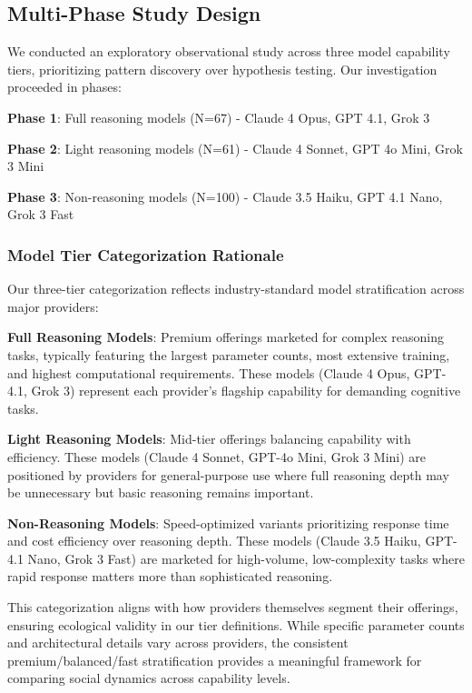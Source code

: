 \documentclass[11pt,letterpaper]{article}
\newcommand{\exponedataTotalSessionsRaw}{67}
\newcommand{\exponedataTotalSessions}{N=\exponedataTotalSessionsRaw}
\newcommand{\exptwoTotalSessionsRaw}{61}
\newcommand{\exptwoTotalSessions}{N=\exptwoTotalSessionsRaw}
\newcommand{\expthreeTotalSessionsRaw}{100}
\newcommand{\expthreeTotalSessions}{N=\expthreeTotalSessionsRaw}
\begin{document}
\subsection{Multi-Phase Study Design}

We conducted an exploratory observational study across three model capability tiers, prioritizing pattern discovery over hypothesis testing. Our investigation proceeded in phases:

\textbf{Phase 1}: Full reasoning models (\exponedataTotalSessions{}) - Claude 4 Opus, GPT 4.1, Grok 3

\textbf{Phase 2}: Light reasoning models (\exptwoTotalSessions{}) - Claude 4 Sonnet, GPT 4o Mini, Grok 3 Mini

\textbf{Phase 3}: Non-reasoning models (\expthreeTotalSessions{}) - Claude 3.5 Haiku, GPT 4.1 Nano, Grok 3 Fast

\subsubsection{Model Tier Categorization Rationale}

Our three-tier categorization reflects industry-standard model stratification across major providers:

\textbf{Full Reasoning Models}: Premium offerings marketed for complex reasoning tasks, typically featuring the largest parameter counts, most extensive training, and highest computational requirements. These models (Claude 4 Opus, GPT-4.1, Grok 3) represent each provider's flagship capability for demanding cognitive tasks.

\textbf{Light Reasoning Models}: Mid-tier offerings balancing capability with efficiency. These models (Claude 4 Sonnet, GPT-4o Mini, Grok 3 Mini) are positioned by providers for general-purpose use where full reasoning depth may be unnecessary but basic reasoning remains important.

\textbf{Non-Reasoning Models}: Speed-optimized variants prioritizing response time and cost efficiency over reasoning depth. These models (Claude 3.5 Haiku, GPT-4.1 Nano, Grok 3 Fast) are marketed for high-volume, low-complexity tasks where rapid response matters more than sophisticated reasoning.

This categorization aligns with how providers themselves segment their offerings, ensuring ecological validity in our tier definitions. While specific parameter counts and architectural details vary across providers, the consistent premium/balanced/fast stratification provides a meaningful framework for comparing social dynamics across capability levels.
\end{document}
